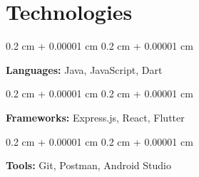 \documentclass[10pt, a4paper]{article}
\newenvironment{onecolentry}{
    \begin{adjustwidth}{
        0.2 cm + 0.00001 cm
    }{
        0.2 cm + 0.00001 cm
    }
}{
    \end{adjustwidth}
} %
\begin{document}
    \section{Technologies}
    
            \begin{onecolentry}
                \textbf{Languages:} Java, JavaScript, Dart
            \end{onecolentry}
            \vspace{0.1cm}
            \begin{onecolentry}
                \textbf{Frameworks:} Express.js, React, Flutter
            \end{onecolentry}
            \vspace{0.1 cm}
            \begin{onecolentry}
            \textbf{Tools:} Git, Postman, Android Studio
            \end{onecolentry}
        
\end{document}
